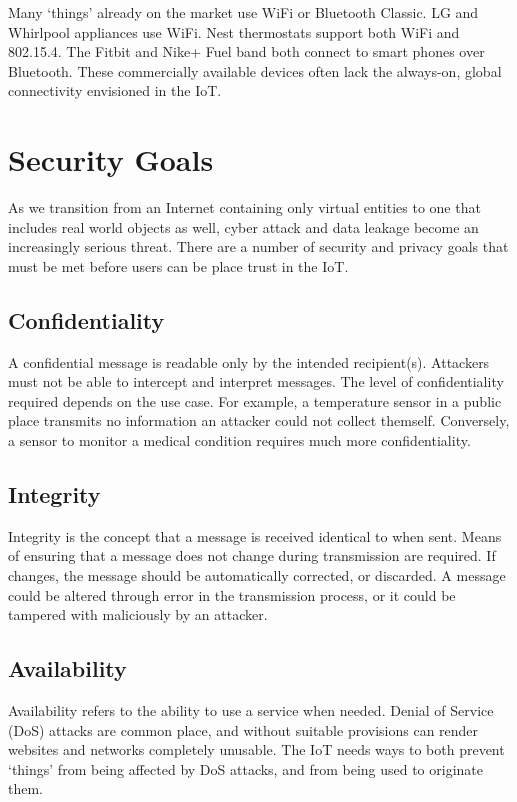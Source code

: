 \documentclass[10pt,journal,compsoc]{IEEEtran}
\begin{document}
Many `things' already on the market use WiFi or Bluetooth Classic. LG and
Whirlpool appliances use WiFi.  Nest thermostats support both WiFi and
802.15.4. The Fitbit and Nike+ Fuel band both connect to smart phones over
Bluetooth. These commercially available devices often lack the always-on,
global connectivity envisioned in the IoT.


\section{Security Goals}
As we transition from an Internet containing only virtual entities to one that
includes real world objects as well, cyber attack and data leakage become an
increasingly serious threat. There are a number of security and privacy goals
that must be met before users can be place trust in the IoT.

\subsection{Confidentiality}
A confidential message is readable only by the intended recipient(s).
Attackers must not be able to intercept and interpret messages. The level of
confidentiality required depends on the use case. For example, a temperature
sensor in a public place transmits no information an attacker could not collect
themself. Conversely, a sensor to monitor a medical condition requires much
more confidentiality. 

\subsection{Integrity}
Integrity is the concept that a message is received identical to when sent.
Means of ensuring that a message does not change during transmission are
required. If changes, the message should be automatically corrected, or
discarded. A message could be altered through error in the transmission
process, or it could be tampered with maliciously by an attacker. 

\subsection{Availability}
Availability refers to the ability to use a service when needed.  Denial of
Service (DoS) attacks are common place, and without suitable provisions can
render websites and networks completely unusable. The IoT needs ways to both
prevent `things' from being affected by DoS attacks, and from being used to
originate them.
\end{document}
